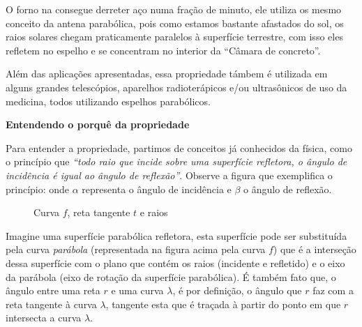O forno na  consegue derreter aço numa fração de minuto, ele utiliza os mesmo conceito da antena parabólica, pois como estamos bastante afastados do sol, os raios solares chegam praticamente paralelos à superfície terrestre, com isso eles refletem no espelho e se concentram no interior da “Câmara de concreto”.

Além das aplicações apresentadas, essa propriedade támbem é utilizada em alguns grandes telescópios, aparelhos radioterápicos e/ou ultrasônicos de uso da medicina, todos utilizando espelhos parabólicos.

\textbf{Entendendo o porquê da propriedade}

Para entender a propriedade, partimos de conceitos já conhecidos da física, como o princípio que \textit{“todo raio que incide sobre uma superfície refletora, o ângulo de incidência é igual ao ângulo de reflexão”}. Observe a figura que exemplifica o princípio: onde \(\alpha\) representa o ângulo de incidência e \(\beta\) o ângulo de reflexão.

\begin{figure}[H]
\centering

\caption{Curva \(f\), reta tangente \(t\) e raios}
\end{figure}


Imagine uma superfície parabólica refletora, esta superfície pode ser substituída pela curva \textit{parábola} (representada na figura acima pela curva \(f\)) que é a interseção dessa superfície com o plano que contém os raios (incidente e refletido) e o eixo da parábola (eixo de rotação da superfície parabólica).
É também fato que, o ângulo entre uma reta \(r\) e uma curva \(\lambda\), é por definição, o ângulo que \(r\) faz com a reta tangente à curva \(\lambda\), tangente esta que é traçada à partir do ponto em que \(r\) intersecta a curva \(\lambda\).

